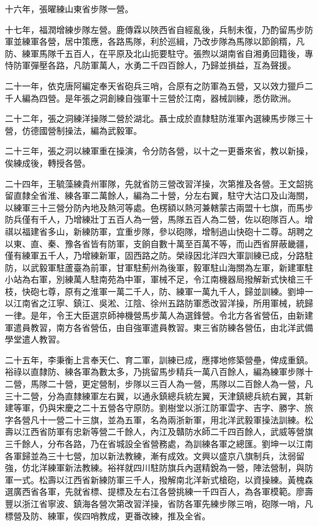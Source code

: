 \begin{pinyinscope}
十六年，張曜練山東省步隊一營。

十七年，福潤增練步隊左營。鹿傳霖以陜西省自經亂後，兵制未復，乃酌留馬步防軍並練軍各營，居中策應，各路馬隊，利於巡緝，乃改步隊為馬隊以節餉糈，凡防、練軍馬隊千五百人，在平原及北山扼要駐守。張煦以湖南省自湘勇回籍後，專恃防軍彈壓各路，凡防軍萬人，水勇二千四百餘人，乃歸並損益，互為聲援。

二十一年，依克唐阿編定奉天省砲兵三哨，合原有之防軍為五營，又以效力獵戶二千人編為四營。是年張之洞創練自強軍十三營於江南，器械訓練，悉仿歐洲。

二十二年，張之洞練洋操隊二營於湖北。聶士成於直隸駐防淮軍內選練馬步隊三十營，仿德國營制操法，編為武毅軍。

二十三年，張之洞以練軍重在操演，令分防各營，以十之一更番來省，教以新操，俟練成後，轉授各營。

二十四年，王毓藻練貴州軍隊，先就省防三營改習洋操，次第推及各營。王文韶挑留直隸全省淮、練各軍二萬餘人，編為二十營，分左右翼，駐守大沽口及山海關，以練軍三十三營分防內地及熱河等處。色楞額以熱河兼轄蒙古兩盟十七旗，而馬步防兵僅有千人，乃增練壯丁五百人為一營，馬隊五百人為二營，佐以砲隊百人。增祺以福建省多山，新練防軍，宜重步隊，參以砲隊，增制過山快砲十二尊。胡聘之以東、直、秦、豫各省皆有防軍，支餉自數十萬至百萬不等，而山西省屏蔽畿疆，僅有練軍五千人，乃增練新軍，固西路之防。榮祿因北洋四大軍訓練已成，分路駐防，以武毅軍駐蘆臺為前軍，甘軍駐薊州為後軍，毅軍駐山海關為左軍，新建軍駐小站為右軍，別練萬人駐南苑為中軍，軍械不足，令江南機器局撥解新式快槍三千枝，快砲七尊，原有之淮軍一萬二千人，防、練軍一萬九千人，歸並訓練。劉坤一以江南省之江寧、鎮江、吳淞、江陰、徐州五路防軍悉改習洋操，所用軍械，統歸一律。是年，令王大臣選京師神機營馬步萬人為選鋒營。令北方各省營伍，由新建軍遣員教習，南方各省營伍，由自強軍遣員教習。東三省防練各營伍，由北洋武備學堂遣人教習。

二十五年，李秉衡上言奉天仁、育二軍，訓練已成，應擇地修築營壘，俾成重鎮。裕祿以直隸防、練各軍為數太多，乃挑留馬步精兵一萬八百餘人，編為練軍步隊十二營，馬隊二十營，更定營制，步隊以三百人為一營，馬隊以二百餘人為一營，凡三十二營，分為直隸練軍左右翼，以通永鎮總兵統左翼，天津鎮總兵統右翼，其新建等軍，仍與宋慶之二十五營各守原防。劉樹堂以浙江防軍雲字、吉字、勝字、旅字各營凡十一營二十三旗，並為五軍，名為兩浙新軍，用北洋武毅軍操法訓練。松壽以江西省防軍有忠新等營二千餘人，內江及贛防水師二千四百餘人，武威等營旗三千餘人，分布各路，乃在省城設全省營務處，為訓練各軍之總匯。劉坤一以江南各軍歸並為三十七營，加以新法教練，漸有成效。文興以盛京八旗制兵，汰弱留強，仿北洋練軍新法教練。裕祥就四川駐防旗兵內選精銳為一營，陣法營制，與防軍一式。松壽以江西省新練防軍三千人，撥解南北洋新式槍砲，以資操練。黃槐森選廣西省各軍，先就省標、提標及左右江各營挑練一千四百人，為各軍模範。廖壽豐以浙江省寧波、鎮海各營次第改習洋操，省防各軍先練步隊三哨，砲隊一哨，凡標營及防、練軍，俟四哨教成，更番改練，推及全省。


\end{pinyinscope}
